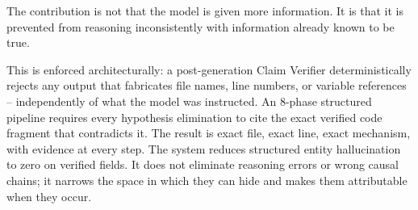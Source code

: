 \documentclass[12pt,a4paper]{article}
\begin{document}
The contribution is not that the model is given more information. It is that it is
prevented from reasoning inconsistently with information already known to be true.

This is enforced architecturally: a post-generation Claim Verifier deterministically
rejects any output that fabricates file names, line numbers, or variable references --
independently of what the model was instructed. An 8-phase structured pipeline requires
every hypothesis elimination to cite the exact verified code fragment that contradicts it.
The result is exact file, exact line, exact mechanism, with evidence at every step. The
system reduces structured entity hallucination to zero on verified fields. It does not
eliminate reasoning errors or wrong causal chains; it narrows the space in which they can
hide and makes them attributable when they occur.
\end{document}
